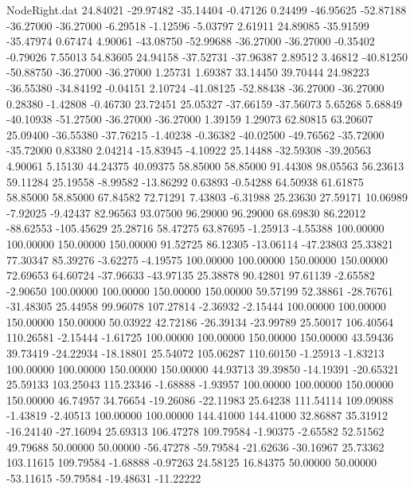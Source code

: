 \begin{filecontents}{NodeRight.dat}
  24.84021  -29.97482  -35.14404    -0.47126    0.24499  -46.95625  -52.87188  -36.27000  -36.27000   -6.29518   -1.12596   -5.03797    2.61911
  24.89085  -35.91599  -35.47974     0.67474    4.90061  -43.08750  -52.99688  -36.27000  -36.27000   -0.35402   -0.79026    7.55013   54.83605
  24.94158  -37.52731  -37.96387     2.89512    3.46812  -40.81250  -50.88750  -36.27000  -36.27000    1.25731    1.69387   33.14450   39.70444
  24.98223  -36.55380  -34.84192    -0.04151    2.10724  -41.08125  -52.88438  -36.27000  -36.27000    0.28380   -1.42808   -0.46730   23.72451
  25.05327  -37.66159  -37.56073     5.65268    5.68849  -40.10938  -51.27500  -36.27000  -36.27000    1.39159    1.29073   62.80815   63.20607
  25.09400  -36.55380  -37.76215    -1.40238   -0.36382  -40.02500  -49.76562  -35.72000  -35.72000    0.83380    2.04214  -15.83945   -4.10922
  25.14488  -32.59308  -39.20563     4.90061    5.15130   44.24375   40.09375   58.85000   58.85000   91.44308   98.05563   56.23613   59.11284
  25.19558   -8.99582  -13.86292     0.63893   -0.54288   64.50938   61.61875   58.85000   58.85000   67.84582   72.71291    7.43803   -6.31988
  25.23630   27.59171   10.06989    -7.92025   -9.42437   82.96563   93.07500   96.29000   96.29000   68.69830   86.22012  -88.62553 -105.45629
  25.28716   58.47275   63.87695    -1.25913   -4.55388  100.00000  100.00000  150.00000  150.00000   91.52725   86.12305  -13.06114  -47.23803
  25.33821   77.30347   85.39276    -3.62275   -4.19575  100.00000  100.00000  150.00000  150.00000   72.69653   64.60724  -37.96633  -43.97135
  25.38878   90.42801   97.61139    -2.65582   -2.90650  100.00000  100.00000  150.00000  150.00000   59.57199   52.38861  -28.76761  -31.48305
  25.44958   99.96078  107.27814    -2.36932   -2.15444  100.00000  100.00000  150.00000  150.00000   50.03922   42.72186  -26.39134  -23.99789
  25.50017  106.40564  110.26581    -2.15444   -1.61725  100.00000  100.00000  150.00000  150.00000   43.59436   39.73419  -24.22934  -18.18801
  25.54072  105.06287  110.60150    -1.25913   -1.83213  100.00000  100.00000  150.00000  150.00000   44.93713   39.39850  -14.19391  -20.65321
  25.59133  103.25043  115.23346    -1.68888   -1.93957  100.00000  100.00000  150.00000  150.00000   46.74957   34.76654  -19.26086  -22.11983
  25.64238  111.54114  109.09088    -1.43819   -2.40513  100.00000  100.00000  144.41000  144.41000   32.86887   35.31912  -16.24140  -27.16094
  25.69313  106.47278  109.79584    -1.90375   -2.65582   52.51562   49.79688   50.00000   50.00000  -56.47278  -59.79584  -21.62636  -30.16967
  25.73362  103.11615  109.79584    -1.68888   -0.97263   24.58125   16.84375   50.00000   50.00000  -53.11615  -59.79584  -19.48631  -11.22222

\end{filecontents}
